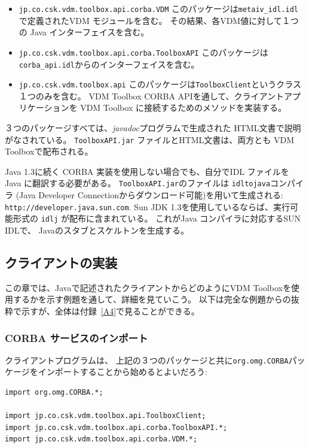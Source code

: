\documentclass[\pformat,12pt]{jarticle}
\begin{document}
\begin{itemize}
\item  {\tt jp.co.csk.vdm.toolbox.api.corba.VDM}
  このパッケージは{\tt metaiv\_idl.idl} で定義されたVDM モジュールを含む。
その結果、各VDM値に対して１つの Java インターフェイスを含む。

\item {\tt jp.co.csk.vdm.toolbox.api.corba.ToolboxAPI} 
  このパッケージは{\tt corba\_api.idl}からのインターフェイスを含む。

\item {\tt jp.co.csk.vdm.toolbox.api} 
  このパッケージは{\tt ToolboxClient}というクラス１つのみを含む。
 VDM Toolbox CORBA APIを通して、クライアントアプリケーションを VDM Toolbox に接続するためのメソッドを実装する。
\end{itemize}

３つのパッケージすべては、{\em javadoc}プログラムで生成された HTML文書で説明がなされている。
 {\tt ToolboxAPI.jar} ファイルとHTML文書は、両方とも VDM Toolboxで配布される。

Java 1.3に続く CORBA 実装を使用しない場合でも、自分でIDL ファイルを Java に翻訳する必要がある。
\texttt{ToolboxAPI.jar}のファイルは {\tt idltojava}コンパイラ (Java Developer Connectionからダウンロード可能)を用いて生成される: 
\verb+http://developer.java.sun.com+. 
 Sun JDK 1.3を使用しているならば、実行可能形式の {\tt idlj} が配布に含まれている。
これがJava コンパイラに対応するSUN IDLで、 Javaのスタブとスケルトンを生成する。


\subsection{クライアントの実装}

この章では、Javaで記述されたクライアントからどのようにVDM Toolboxを使用するかを示す例題を通して、詳細を見ていこう。
以下は完全な例題からの抜粋で示すが、全体は付録~\ref{A4}で見ることができる。

\subsubsection{CORBA サービスのインポート}

クライアントプログラムは、 上記の３つのパッケージと共に{\tt org.omg.CORBA}パッケージをインポートすることから始めるとよいだろう:

\begin{verbatim}
import org.omg.CORBA.*;

import jp.co.csk.vdm.toolbox.api.ToolboxClient;
import jp.co.csk.vdm.toolbox.api.corba.ToolboxAPI.*;
import jp.co.csk.vdm.toolbox.api.corba.VDM.*;
\end{verbatim}
\end{document}
